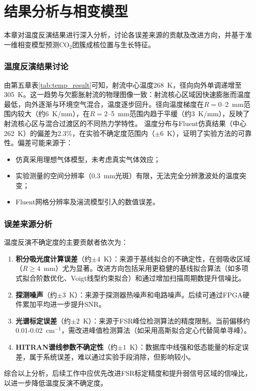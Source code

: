 ﻿\chapter{结果分析与相变模型}
	本章对温度反演结果进行深入分析，讨论各误差来源的贡献及改进方向，并基于准一维相变模型预测CO$_2$团簇成核位置与生长特征。
	\subsection{温度反演结果讨论}
	由第五章表\ref{tab:temp_result}可知，射流中心温度268~K，径向向外单调递增至305~K。这一趋势与欠膨胀射流的物理图像一致：射流核心区域因快速膨胀而温度最低，向外逐渐与环境空气混合，温度逐步回升。径向温度梯度在$R=0$--2~mm范围内较大（约6~K/mm），在$R=2$--5~mm范围内趋于平缓（约3~K/mm），反映了射流核心区与混合过渡区的不同热力学特性。
	温度分布与Fluent仿真结果（中心262~K）的偏差为2.3\%，在实验不确定度范围内（$\pm6$~K），证明了实验方法的可靠性。偏差可能来源于：
	\begin{itemize}
		\item 仿真采用理想气体模型，未考虑真实气体效应；
		\item 实验测量的空间分辨率（0.3~mm光斑）有限，无法完全分辨激波处的温度突变；
		\item Fluent网格分辨率及湍流模型引入的数值误差。
	\end{itemize}
	\subsection{误差来源分析}
	温度反演不确定度的主要贡献者依次为：
	\begin{enumerate}[label=(\arabic*)]
		\item \textbf{积分吸光度计算误差}（约$\pm4$~K）：来源于基线拟合的不确定性，在弱吸收区域（$R\ge4$~mm）尤为显著。改进方向包括采用更稳健的基线拟合算法（如多项式拟合阶数优化、Voigt线型约束拟合）和通过增加扫描周期数提升信噪比。
		\item \textbf{探测噪声}（约$\pm3$~K）：来源于探测器热噪声和电路噪声。后续可通过FPGA硬件累加平均进一步提升SNR。
		\item \textbf{光谱标定误差}（约$\pm2$~K）：来源于FSR峰位检测算法的精度限制。当前偏移约0.01-0.02~cm$^{-1}$，需改进峰值检测算法（如采用高斯拟合定心代替简单寻峰）。
		\item \textbf{HITRAN谱线参数不确定性}（约$\pm1$~K）：数据库中线强和低态能量的标定误差，属于系统误差，难以通过实验手段消除，但影响较小。
	\end{enumerate}
	综合以上分析，后续工作中应优先改进FSR标定精度和提升弱信号区域的信噪比，以进一步降低温度反演不确定度。
